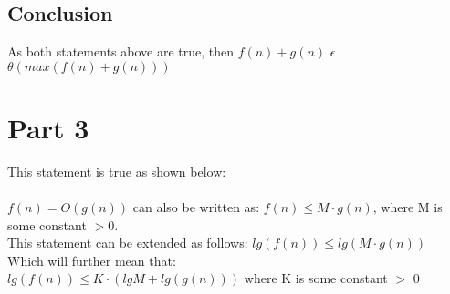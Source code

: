 \documentclass[]{article}
\begin{document}
\subsection{Conclusion}
As both statements above are true, then $ f(n) + g(n) $ $\epsilon $ $ \theta (max(f(n) + g(n)))$


\section{Part 3}
This statement is true as shown below: \\ \\
$f(n) = O(g(n))$ can also be written as: $f(n) \leq M \cdot g(n)$, where M is some constant $> 0$. \\
This statement can be extended as follows:
$lg(f(n)) \leq lg(M \cdot g(n))$ \\
Which will further mean that: \\
$ lg (f(n)) \leq K \cdot (lg M + lg(g(n)))  $  where K is some constant $>$ 0 \\
\end{document}
